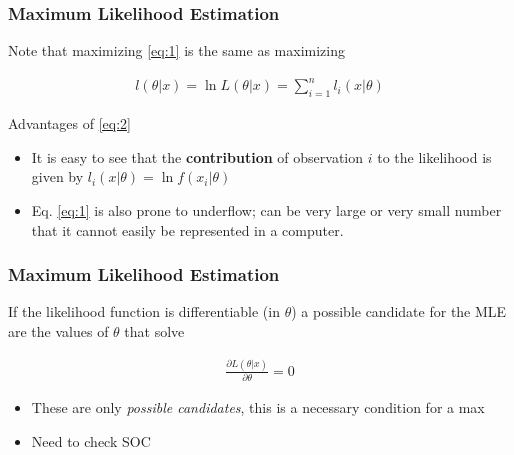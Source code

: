 \documentclass[
  shownotes,
  xcolor={svgnames},
  hyperref={colorlinks,citecolor=DarkBlue,linkcolor=DarkRed,urlcolor=DarkBlue}
  ]{beamer}
\begin{document}
\begin{frame}[fragile]
\frametitle{Maximum Likelihood Estimation}
Note that maximizing \eqref{eq:1} is the same as maximizing

\begin{align}\label{eq:2}
l(\theta|x)=\ln L(\theta|x)=\sum_{i=1}^n l_i(x|\theta)
\end{align}

\bigskip
Advantages of \eqref{eq:2}
\begin{itemize}
\item It is easy to see that the {\bf contribution} of observation $i$ to the likelihood is given by $l_i(x|\theta)=\ln f(x_i|\theta)$
\item Eq. \eqref{eq:1} is also prone to underflow; can be very large or very small number that it cannot easily be represented in a computer. 
\end{itemize}

\end{frame}


\begin{frame}[fragile]
\frametitle{Maximum Likelihood Estimation}
If the likelihood function is differentiable (in $\theta$) a possible candidate for the MLE are the values of $\theta$ that solve

\begin{align}
  \frac{\partial L(\theta|x)}{\partial \theta} = 0
\end{align}

\begin{itemize}
\item These are  only {\it possible candidates}, this is a necessary condition for a max
\item Need to check SOC
\end{itemize}

\end{frame}
\end{document}
